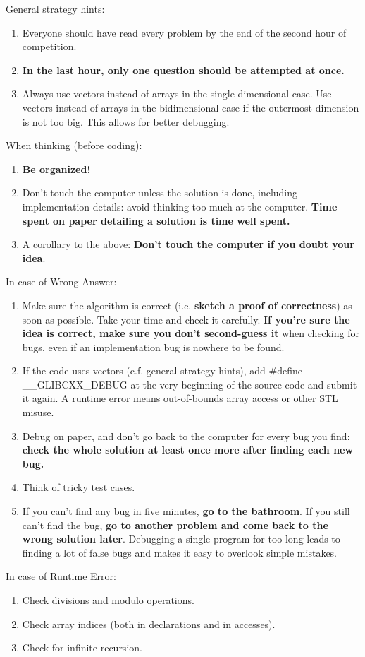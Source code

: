       General strategy hints:
      \begin{enumerate}
        \item Everyone should have read every problem by the end of the second hour of competition.
        \item \textbf{In the last hour, only one question should be attempted at once.}
        \item Always use vectors instead of arrays in the single dimensional case. Use vectors instead of arrays in the bidimensional case if the outermost dimension is not too big. This allows for better debugging.
      \end{enumerate}

      When thinking (before coding):
      \begin{enumerate}
        \item \textbf{Be organized!}
        \item Don't touch the computer unless the solution is done, including implementation details: avoid thinking too much at the computer. \textbf{Time spent on paper detailing a solution is time well spent.}
        \item A corollary to the above: \textbf{Don't touch the computer if you doubt your idea}.
      \end{enumerate}

      In case of Wrong Answer:
      \begin{enumerate}
        \item Make sure the algorithm is correct (i.e. \textbf{sketch a proof of correctness}) as soon as possible. Take your time and check it carefully. \textbf{If you're sure the idea is correct, make sure you don't second-guess it} when checking for bugs, even if an implementation bug is nowhere to be found.
        \item If the code uses vectors (c.f. general strategy hints), add \#define \_\_GLIBCXX\_DEBUG at the very beginning of the source code and submit it again. A runtime error means out-of-bounds array access or other STL misuse.
        \item Debug on paper, and don't go back to the computer for every bug you find: \textbf{check the whole solution at least once more after finding each new bug.}
        \item Think of tricky test cases.
        \item If you can't find any bug in five minutes, \textbf{go to the bathroom}. If you still can't find the bug, \textbf{go to another problem and come back to the wrong solution later}. Debugging a single program for too long leads to finding a lot of false bugs and makes it easy to overlook simple mistakes.
      \end{enumerate}

      In case of Runtime Error:
      \begin{enumerate}
        \item Check divisions and modulo operations.
        \item Check array indices (both in declarations and in accesses).
        \item Check for infinite recursion.
      \end{enumerate}
